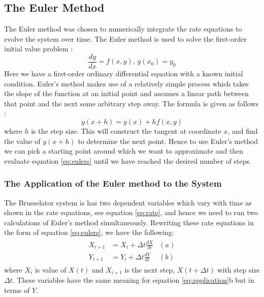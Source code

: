\documentclass[reprint, amsmath, amssymb, aps]{revtex4-2}
\begin{document}
\subsection{The Euler Method}
The Euler method was chosen to numerically integrate the rate equations to evolve the system over time. The Euler method is used to solve the first-order initial value problem \cite{eulerError}:
\begin{equation}
	\frac{dy}{dx} = f\left(x, y \right),\, y(x_0) = y_0
\end{equation}Here we have a first-order ordinary differential equation with a known initial condition. Euler's method makes use of a relatively simple process which takes the slope of the function at an initial point and assumes a linear path between that point and the next some arbitrary step away. The formula is given as follows \cite{paulsNotes}:
\begin{equation}
	y(x+h) = y(x) + h f(x, y)
	\label{eq:eulers}
\end{equation}where $h$ is the step size. This will construct the tangent at coordinate $x$, and find the value of $y(x+h)$ to determine the next point. Hence to use Euler's method we can pick a starting point around which we want to approximate and then evaluate equation \ref{eq:eulers} until we have reached the desired number of steps.

\subsubsection{The Application of the Euler method to the System}

The Brusselator system is has two dependent variables which vary with time as shown in the rate equations, see equation \ref{eq:rate}, and hence we need to run two calculations of Euler's method simultaneously. Rewriting these rate equations in the form of equation \ref{eq:eulers}, we have the following:
\begin{align}
	\begin{aligned}
	X_{i+1} &= X_i + \Delta t \frac{dX}{dt} & (a)\\
	Y_{i+1} &= Y_i + \Delta t \frac{dY}{dt} & (b)
	\end{aligned}
	\label{eq:application}
\end{align}where $X_{i}$ is value of $X(t)$ and $X_{i+1}$ is the next step, $X(t+\Delta t)$ with step size $\Delta t$. These variables have the same meaning for equation \ref{eq:application}b but in terms of $Y$.
\end{document}
